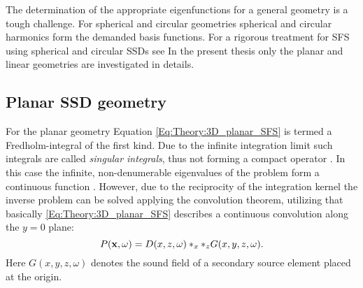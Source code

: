 The determination of the appropriate eigenfunctions for a general geometry is a tough challenge.
For spherical and circular geometries spherical and circular harmonics form the demanded basis functions. For a rigorous treatment for SFS using spherical and circular SSDs see \cite{Ahrens2010phd,Zotter2009phd,Ahrens2012,Ahrens2009:circularSSD_mismatch,Ahrens2009:circular25D_SFR,Ahrens2008:Analytical_Circ_Spherical_SFS}
In the present thesis only the planar and linear geometries are investigated in details.

\subsection{Planar SSD geometry}

For the planar geometry Equation \eqref{Eq:Theory:3D_planar_SFS} is termed a Fredholm-integral of the first kind. Due to the infinite integration limit such integrals are called \emph{singular integrals}, thus not forming a compact operator \cite[p.~921.]{MorseFeshbach1953}. 
In this case the infinite, non-denumerable eigenvalues of the problem form a continuous function \cite{MorseFeshbach1953,Schultz2014:Comparing_approaches}.
However, due to the reciprocity of the integration kernel the inverse problem can be solved applying the convolution theorem, utilizing that basically \eqref{Eq:Theory:3D_planar_SFS} describes a continuous convolution along the $y=0$ plane:
\begin{equation}
P(\mathbf{x},\omega) = D(x,z,\omega)\ast_{x} \ast_{z} G(x,y,z,\omega).
\end{equation}
Here $G(x,y,z,\omega)$ denotes the sound field of a secondary source element placed at the origin.


